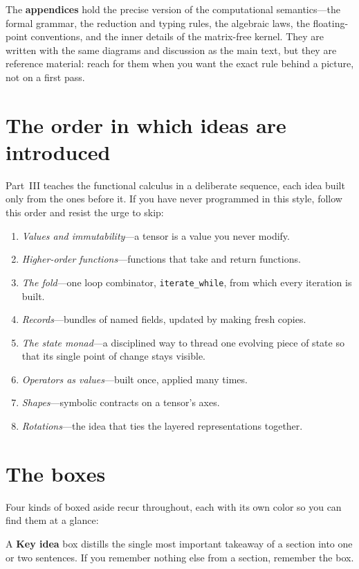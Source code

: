 The \textbf{appendices} hold the precise version of the computational
semantics---the formal grammar, the reduction and typing rules, the algebraic
laws, the floating-point conventions, and the inner details of the matrix-free
kernel. They are written with the same diagrams and discussion as the main text,
but they are reference material: reach for them when you want the exact rule
behind a picture, not on a first pass.

\section*{The order in which ideas are introduced}

Part~III teaches the functional calculus in a deliberate sequence, each idea
built only from the ones before it. If you have never programmed in this style,
follow this order and resist the urge to skip:

\begin{enumerate}[nosep]
  \item \emph{Values and immutability}---a tensor is a value you never modify.
  \item \emph{Higher-order functions}---functions that take and return functions.
  \item \emph{The fold}---one loop combinator, \texttt{iterate\_while}, from
  which every iteration is built.
  \item \emph{Records}---bundles of named fields, updated by making fresh copies.
  \item \emph{The state monad}---a disciplined way to thread one evolving piece
  of state so that its single point of change stays visible.
  \item \emph{Operators as values}---built once, applied many times.
  \item \emph{Shapes}---symbolic contracts on a tensor's axes.
  \item \emph{Rotations}---the idea that ties the layered representations together.
\end{enumerate}

\section*{The boxes}

Four kinds of boxed aside recur throughout, each with its own color so you can
find them at a glance:

\begin{keyidea}
A \textbf{Key idea} box distills the single most important takeaway of a section
into one or two sentences. If you remember nothing else from a section, remember
the box.
\end{keyidea}

